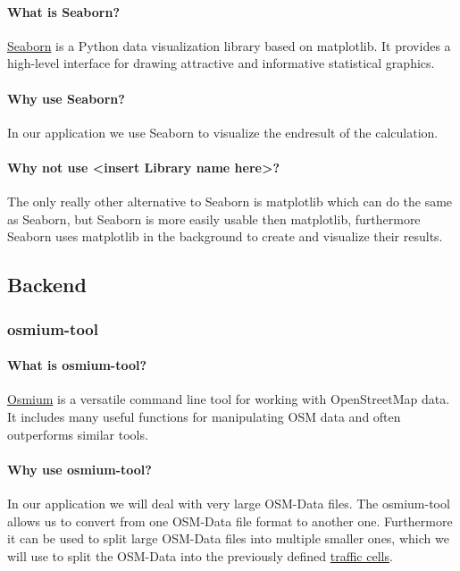 \documentclass[parskip=full]{scrartcl} %
\begin{document}
\paragraph{What is Seaborn?}
\href{https://seaborn.pydata.org/}{Seaborn} is a Python data visualization library based on matplotlib. It provides a high-level interface for drawing attractive and informative statistical graphics.

\paragraph{Why use Seaborn?}
In our application we use Seaborn to visualize the endresult of the calculation.

\paragraph{Why not use <insert Library name here>?}
The only really other alternative to Seaborn is matplotlib which can do the same as Seaborn, but Seaborn is more easily usable then matplotlib, furthermore Seaborn uses matplotlib in the background to create and visualize their results.

\subsection{Backend}

\subsubsection{osmium-tool}

\paragraph{What is osmium-tool?}
\href{https://osmcode.org/osmium-tool/}{Osmium}
is a versatile command line tool for working with OpenStreetMap data. It includes many useful functions for manipulating OSM data and often outperforms similar tools.

\paragraph{Why use osmium-tool?}
In our application we will deal with very large OSM-Data files.
The osmium-tool allows us to convert from one OSM-Data file format to another one. 
Furthermore it can be used to split large OSM-Data files into multiple smaller ones, which we will use to split the OSM-Data into the previously defined 
\hyperref[sec:Glossary]{traffic cells}.
\end{document}
